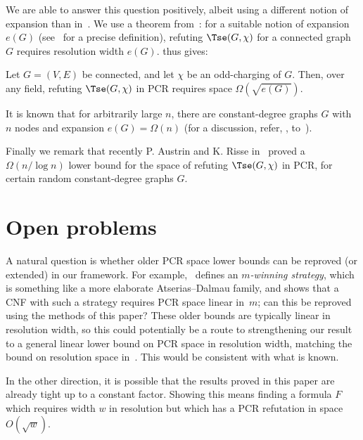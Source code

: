 \documentclass{toc}
\begin{document}
We are able to answer this question positively, albeit using a different notion of expansion than 
in~\cite{DBLP:conf/icalp/FilmusLMNV13}. 
We use a theorem from~\cite{DBLP:journals/jacm/Ben-SassonW01}:
for a suitable notion of expansion $e(G)$ (see~\cite{DBLP:journals/jacm/Ben-SassonW01} for a precise definition),
refuting $\Tse(G,\chi)$ for a connected graph $G$ requires resolution width $e(G)$.
  thus gives:

\begin{theorem} Let $G = (V, E)$ be connected, and let $\chi$ be an odd-charging of $G$.
Then, over any field, refuting $\Tse(G, \chi)$ in PCR requires space $\Omega(\sqrt{e(G)})$.
\end{theorem}

It is known that for arbitrarily large $n$, there are constant-degree graphs $G$ with $n$ nodes
and expansion \mbox{$e(G) = \Omega(n)$} (for a discussion, refer, \eg,  to~\cite{DBLP:journals/jacm/Urquhart87}).

Finally we remark that recently  P. Austrin and K. Risse  in~\cite{DBLP:conf/soda/AustrinR22} 
 proved a $\Omega(n/\log n)$ lower bound for the space of refuting  $\Tse(G, \chi)$ in PCR, 
 for certain random constant-degree graphs $G$. 


%
\section{Open problems} \label{sec:open}
%

A natural question is whether older PCR space lower bounds
can be reproved (or extended) in our framework.
For example,~\cite{DBLP:journals/jacm/BonacinaG15}
defines an \emph{$m$-winning strategy}, which is something
like a more elaborate Atserias--Dalmau family, and 
shows that a CNF with such a strategy requires PCR space linear in~$m$;
can this be reproved using the methods of this paper? 
These older bounds are typically linear in resolution width, so this
could potentially be a route to strengthening our result to 
a general linear lower bound on PCR space in resolution width,
matching the bound on resolution space in~\cite{DBLP:journals/jcss/AtseriasD08}.
This would be consistent with what is known.

In the other direction, it is possible that the results proved
in this paper are already tight up to a constant factor.
Showing this means finding
 a formula $F$ which requires width $w$ in resolution but which has  a PCR refutation in
space $O(\sqrt{w})$.
\end{document}
